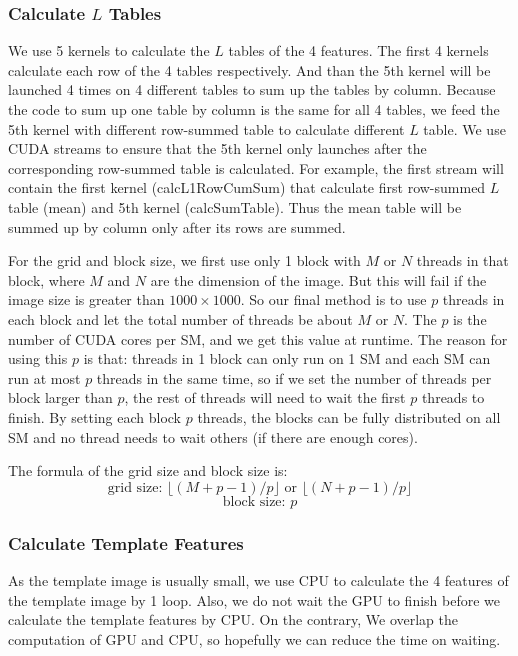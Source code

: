 \documentclass[12pt, a4paper]{article}
\begin{document}
    \subsubsection{Calculate $L$ Tables}
      We use 5 kernels to calculate the $L$ tables of the 4 features. The first
      4 kernels calculate each row of the 4 tables respectively. And than the
      5th kernel will be launched 4 times on 4 different tables to sum up the
      tables by column. Because the code to sum up one table by column is the
      same for all 4 tables, we feed the 5th kernel with different row-summed
      table to calculate different $L$ table.
      We use CUDA streams to ensure that the 5th kernel only
      launches after the corresponding row-summed table is calculated. For example,
      the first stream will contain the first kernel (calcL1RowCumSum) that
      calculate first row-summed $L$ table (mean) and 5th kernel (calcSumTable).
      Thus the mean table will be summed up by column only after its rows are summed.

      For the grid and block size, we first use only 1 block with $M$ or $N$ threads
      in that block, where $M$ and $N$ are the dimension of the image. But this
      will fail if the image size is greater than $1000\times1000$. So our final
      method is to use $p$ threads in each block and let the total number of
      threads be about $M$ or $N$. The $p$ is the number of CUDA cores per SM,
      and we get this value at runtime. The reason for using this $p$ is that:
      threads in 1 block can only run on 1 SM and each SM can run at most $p$
      threads in the same time, so if we set the number of threads per block larger
      than $p$, the rest of threads will need to wait the first $p$ threads to
      finish. By setting each block $p$ threads, the blocks can be fully distributed
      on all SM and no thread needs to wait others (if there are enough cores).

      The formula of the grid size and block size is:
      \[\text{grid size: }\lfloor(M+p-1)/p\rfloor\text{ or }\lfloor(N+p-1)/p\rfloor\]
      \[\text{block size: }p\]

    \subsubsection{Calculate Template Features}
      As the template image is usually small, we use CPU to calculate the 4
      features of the template image by 1 loop. Also, we do not wait the GPU
      to finish before we calculate the template features by CPU. On the contrary,
      We overlap the computation of GPU and CPU, so hopefully we can reduce the
      time on waiting.
\end{document}
